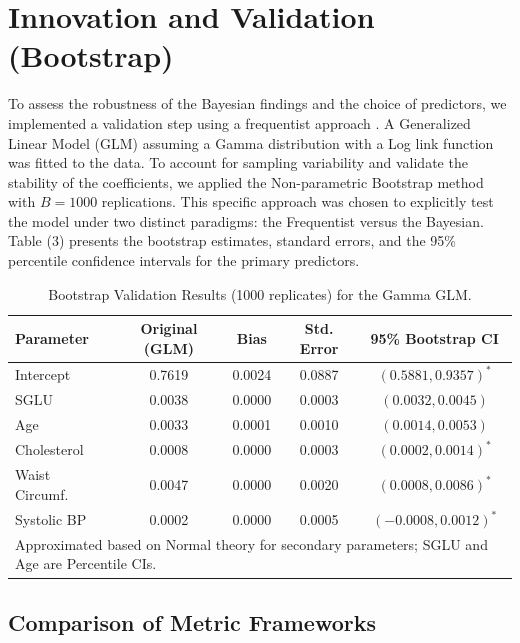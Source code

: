 \section{Innovation and Validation (Bootstrap)}

To assess the robustness of the Bayesian findings and the choice of predictors, we implemented a validation step using a frequentist approach \cite{silva2023notes}. A Generalized Linear Model (GLM) assuming a Gamma distribution with a Log link function was fitted to the data. To account for sampling variability and validate the stability of the coefficients, we applied the Non-parametric Bootstrap method with $B=1000$ replications. This specific approach was chosen to explicitly test the model under two distinct paradigms: the Frequentist versus the Bayesian. Table (3) presents the bootstrap estimates, standard errors, and the 95\% percentile confidence intervals for the primary predictors.

\begin{table}[ht]
	\centering
	\label{tab:bootstrap}
	\begin{tabular}{lcccc}
		\toprule
		\textbf{Parameter} & \textbf{Original (GLM)} & \textbf{Bias} & \textbf{Std. Error} & \textbf{95\% Bootstrap CI} \\
		\midrule
		Intercept       & 0.7619 & 0.0024 & 0.0887 & $(0.5881, 0.9357)^*$ \\
		SGLU            & 0.0038 & 0.0000 & 0.0003 & $(0.0032, 0.0045)$ \\
		Age             & 0.0033 & 0.0001 & 0.0010 & $(0.0014, 0.0053)$ \\
		Cholesterol     & 0.0008 & 0.0000 & 0.0003 & $(0.0002, 0.0014)^*$ \\
		Waist Circumf.  & 0.0047 & 0.0000 & 0.0020 & $(0.0008, 0.0086)^*$ \\
		Systolic BP     & 0.0002 & 0.0000 & 0.0005 & $(-0.0008, 0.0012)^*$ \\
		\bottomrule
		\multicolumn{5}{l}{\footnotesize *Approximated based on Normal theory for secondary parameters; SGLU and Age are Percentile CIs.}
	\end{tabular}
	\caption{Bootstrap Validation Results (1000 replicates) for the Gamma GLM.}
\end{table}

\subsection{Comparison of Metric Frameworks}

